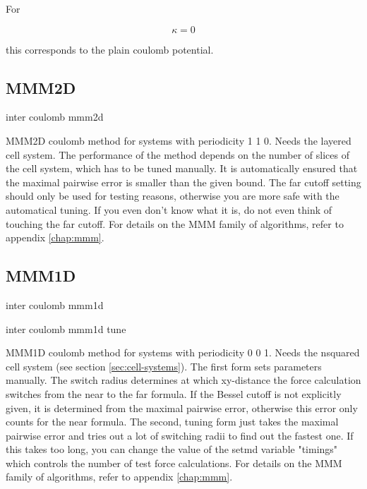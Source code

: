 For

\[ \kappa = 0 \]

this corresponds to the plain coulomb potential.

\subsection{MMM2D}

\begin{essyntax}
 inter coulomb mmm2d  
\end{essyntax}
MMM2D coulomb method for systems with periodicity 1 1 0. Needs the
layered cell system. The performance of the method depends on the
number of slices of the cell system, which has to be tuned manually.
It is automatically ensured that the maximal pairwise error is smaller
than the given bound. The far cutoff setting should only be used for
testing reasons, otherwise you are more safe with the automatical
tuning. If you even don't know what it is, do not even think of
touching the far cutoff. For details on the MMM family of algorithms,
refer to appendix \vref{chap:mmm}.

\subsection{MMM1D}

\begin{essyntax}
  inter coulomb mmm1d  
   

  inter coulomb mmm1d tune 
\end{essyntax}
MMM1D coulomb method for systems with periodicity 0 0 1. Needs the
nsquared cell system (see section \vref{sec:cell-systems}). The first
form sets parameters manually. The switch radius determines at which
xy-distance the force calculation switches from the near to the far
formula. If the Bessel cutoff is not explicitly given, it is
determined from the maximal pairwise error, otherwise this error only
counts for the near formula. The second, tuning form just takes the
maximal pairwise error and tries out a lot of switching radii to find
out the fastest one. If this takes too long, you can change the value
of the setmd variable "timings" which controls the number of test
force calculations. For details on the MMM family of algorithms,
refer to appendix \vref{chap:mmm}.

